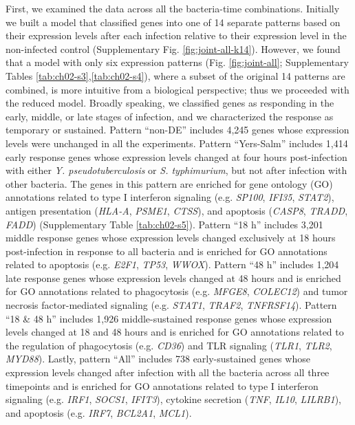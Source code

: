First, we examined the data across all the bacteria-time combinations.
Initially we built a model that classified genes into one of 14
separate patterns based on their expression levels after each
infection relative to their expression level in the non-infected
control (Supplementary Fig. \ref{fig:joint-all-k14}). However, we
found that a model with only six expression patterns
(Fig. \ref{fig:joint-all}; Supplementary Tables
\ref{tab:ch02-s3},\ref{tab:ch02-s4}), where a subset of the original
14 patterns are combined, is more intuitive from a biological
perspective; thus we proceeded with the reduced model. Broadly
speaking, we classified genes as responding in the early, middle, or
late stages of infection, and we characterized the response as
temporary or sustained. Pattern ``non-DE'' includes 4,245 genes whose
expression levels were unchanged in all the experiments. Pattern
``Yers-Salm'' includes 1,414 early response genes whose expression
levels changed at four hours post-infection with either
\emph{Y. pseudotuberculosis} or \emph{S. typhimurium}, but not after
infection with other bacteria. The genes in this pattern are enriched
for gene ontology (GO) annotations related to type I interferon
signaling (e.g. \emph{SP100}, \emph{IFI35}, \emph{STAT2}), antigen
presentation (\emph{HLA-A}, \emph{PSME1}, \emph{CTSS}), and apoptosis
(\emph{CASP8}, \emph{TRADD}, \emph{FADD}) (Supplementary Table
\ref{tab:ch02-s5}). Pattern ``18 h'' includes 3,201 middle response
genes whose expression levels changed exclusively at 18 hours
post-infection in response to all bacteria and is enriched for GO
annotations related to apoptosis (e.g. \emph{E2F1}, \emph{TP53},
\emph{WWOX}). Pattern ``48 h'' includes 1,204 late response genes
whose expression levels changed at 48 hours and is enriched for GO
annotations related to phagocytosis (e.g. \emph{MFGE8},
\emph{COLEC12}) and tumor necrosis factor-mediated signaling
(e.g. \emph{STAT1}, \emph{TRAF2}, \emph{TNFRSF14}). Pattern ``18 \& 48
h'' includes 1,926 middle-sustained response genes whose expression
levels changed at 18 and 48 hours and is enriched for GO annotations
related to the regulation of phagocytosis (e.g. \emph{CD36}) and TLR
signaling (\emph{TLR1}, \emph{TLR2}, \emph{MYD88}). Lastly, pattern
``All'' includes 738 early-sustained genes whose expression levels
changed after infection with all the bacteria across all three
timepoints and is enriched for GO annotations related to type I
interferon signaling (e.g. \emph{IRF1}, \emph{SOCS1}, \emph{IFIT3}),
cytokine secretion (\emph{TNF}, \emph{IL10}, \emph{LILRB1}), and
apoptosis (e.g. \emph{IRF7}, \emph{BCL2A1}, \emph{MCL1}).

